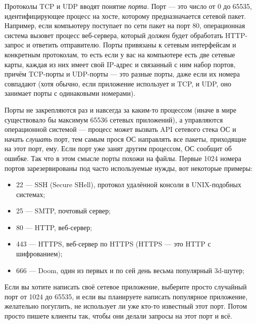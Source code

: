 \documentclass[a5paper]{article}
\begin{document}
Протоколы TCP и UDP вводят понятие \textit{порта}. Порт --- это число от 0 до 65535, идентифицирующее процесс на хосте, которому предназначается сетевой пакет. Например, если компьютеру поступает по сети пакет на порт 80, операционная система вызовет процесс веб-сервера, который должен будет обработать HTTP-запрос и ответить отправителю. Порты привязаны к сетевым интерфейсам и конкретным протоколам, то есть если у вас на компьютере есть две сетевые карты, каждая из них имеет свой IP-адрес и связанный с ним набор портов, причём TCP-порты и UDP-порты --- это разные порты, даже если их номера совпадают (хотя обычно, если приложение использует и TCP, и UDP, оно занимает порты с одинаковыми номерами).

Порты не закрепляются раз и навсегда за каким-то процессом (иначе в мире существовало бы максимум 65536 сетевых приложений), а управляются операционной системой --- процесс может вызвать API сетевого стека ОС и начать \textit{слушать} порт, тем самым прося ОС направлять все пакеты, приходящие на этот порт, ему. Если порт уже занят другим процессом, ОС сообщит об ошибке. Так что в этом смысле порты похожи на файлы. Первые 1024 номера портов зарезервированы под часто используемые нужды, вот некоторые примеры:

\begin{itemize}
    \item 22 --- SSH (Secure SHell), протокол удалённой консоли в UNIX-подобных системах;
    \item 25 --- SMTP, почтовый сервер;
    \item 80 --- HTTP, веб-сервер;
    \item 443 --- HTTPS, веб-сервер по HTTPS (HTTPS --- это HTTP с шифрованием);
    \item 666 --- Doom, один из первых и по сей день весьма популярный 3d-шутер;
\end{itemize}

Если вы хотите написать своё сетевое приложение, выберите просто случайный порт от 1024 до 65535, и если вы планируете написать популярное приложение, желательно погуглить, не использует ли уже кто-то известный этот порт. Потом просто пишете клиенты так, чтобы они делали запросы на этот порт и всё.
\end{document}
